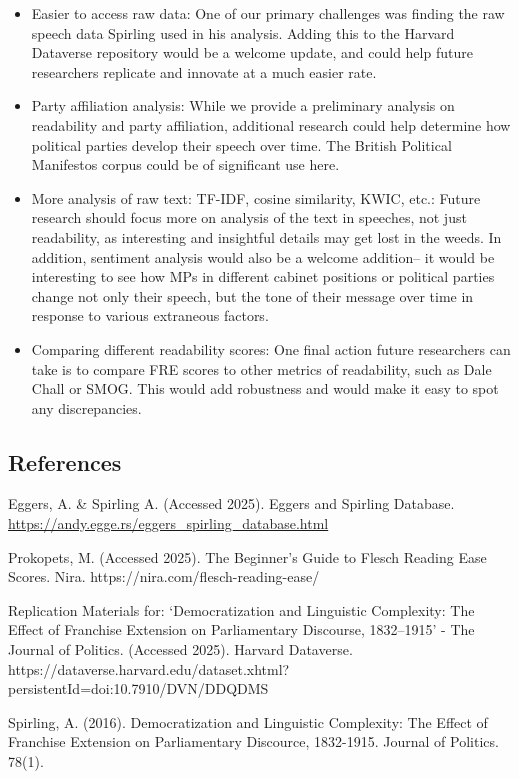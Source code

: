\documentclass[
  letterpaper,
  DIV=11,
  numbers=noendperiod]{scrartcl}
\begin{document}
\begin{itemize}
\item
  Easier to access raw data: One of our primary challenges was finding
  the raw speech data Spirling used in his analysis. Adding this to the
  Harvard Dataverse repository would be a welcome update, and could help
  future researchers replicate and innovate at a much easier rate.
\item
  Party affiliation analysis: While we provide a preliminary analysis on
  readability and party affiliation, additional research could help
  determine how political parties develop their speech over time. The
  British Political Manifestos corpus could be of significant use here.
\item
  More analysis of raw text: TF-IDF, cosine similarity, KWIC, etc.:
  Future research should focus more on analysis of the text in speeches,
  not just readability, as interesting and insightful details may get
  lost in the weeds. In addition, sentiment analysis would also be a
  welcome addition-- it would be interesting to see how MPs in different
  cabinet positions or political parties change not only their speech,
  but the tone of their message over time in response to various
  extraneous factors.
\item
  Comparing different readability scores: One final action future
  researchers can take is to compare FRE scores to other metrics of
  readability, such as Dale Chall or SMOG. This would add robustness and
  would make it easy to spot any discrepancies.
\end{itemize}

\subsection{References}\label{references}

Eggers, A. \& Spirling A. (Accessed 2025). Eggers and Spirling Database.
\url{https://andy.egge.rs/eggers_spirling_database.html}

Prokopets, M. (Accessed 2025). The Beginner's Guide to Flesch Reading
Ease Scores. Nira. https://nira.com/flesch-reading-ease/

Replication Materials for: `Democratization and Linguistic Complexity:
The Effect of Franchise Extension on Parliamentary Discourse,
1832--1915' - The Journal of Politics. (Accessed 2025). Harvard
Dataverse.
https://dataverse.harvard.edu/dataset.xhtml?persistentId=doi:10.7910/DVN/DDQDMS

Spirling, A. (2016). Democratization and Linguistic Complexity: The
Effect of Franchise Extension on Parliamentary Discource, 1832-1915.
Journal of Politics. 78(1).
\end{document}
